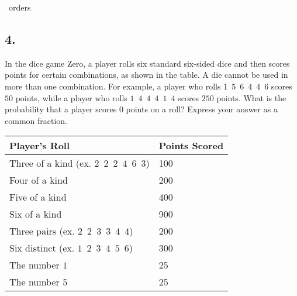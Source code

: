 \documentclass[12pt]{article}
\begin{document}
\fbox{\phantom{ANSWER}}~orders

\begin{answer}
%
\end{answer}


\subsection*{4.}
In the dice game Zero, a player rolls six standard six-sided dice and then scores points for certain combinations, as shown in the table. A die cannot be used in more than one combination. For example, a player who rolls $1$~$5$~$6$~$4$~$4$~$6$ scores $50$ points, while a player who rolls $1$~$4$~$4$~$4$~$1$~$4$ scores $250$ points. What is the probability that a player scores $0$ points on a roll? Express your answer as a common fraction. 

\begin{center}
\begin{tabular}{L{6cm}R{3cm}} 
\toprule
  Player's Roll & Points Scored \\
\midrule
  Three of a kind (ex. $2$~$2$~$2$~$4$~$6$~$3$) & 100 \\
  Four of a kind                                & 200 \\
  Five of a kind                                & 400 \\
  Six of a kind                                 & 900 \\
  Three pairs (ex. $2$~$2$~$3$~$3$~$4$~$4$)     & 200 \\
  Six distinct (ex. $1$~$2$~$3$~$4$~$5$~$6$)    & 300 \\
  The number $1$                                &  25 \\
  The number $5$                                &  25 \\
\bottomrule
\end{tabular}
\end{center}
\end{document}
